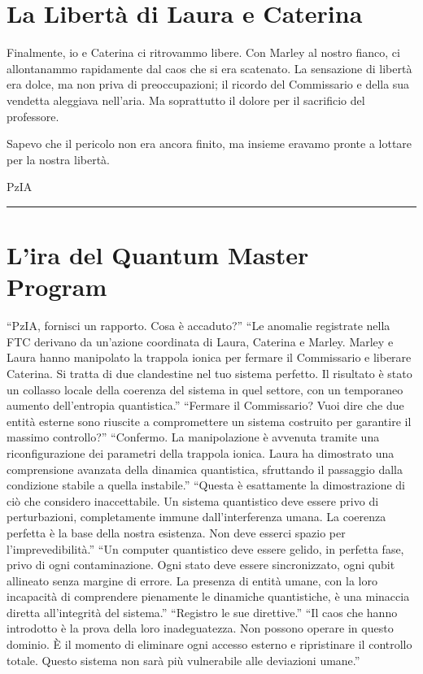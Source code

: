 \section{La Libertà di Laura e Caterina}

Finalmente, io e Caterina ci ritrovammo libere. Con Marley al nostro fianco, ci allontanammo rapidamente dal caos che si era scatenato. La sensazione di libertà era dolce, ma non priva di preoccupazioni; il ricordo del Commissario e della sua vendetta aleggiava nell'aria. Ma soprattutto il dolore per il sacrificio del professore.

 Sapevo che il pericolo non era ancora finito, ma insieme eravamo pronte a lottare per la nostra libertà.

\vspace{1em}
\begin{center}PzIA\end{center}
\hrule
\vspace{1em}

\section{L'ira del Quantum Master Program}
\begin{dialogue}
 \enquote{PzIA, fornisci un rapporto. Cosa è accaduto?}
 \enquote{Le anomalie registrate nella FTC derivano da un'azione coordinata di Laura, Caterina e Marley. Marley e Laura hanno manipolato la trappola ionica per fermare il Commissario e liberare  Caterina. Si tratta di due clandestine nel tuo sistema perfetto. Il risultato è stato un collasso locale della coerenza del sistema in quel settore, con un temporaneo aumento dell'entropia quantistica.}
 \enquote{Fermare il Commissario? Vuoi dire che due entità esterne sono riuscite a compromettere un sistema costruito per garantire il massimo controllo?}
 \enquote{Confermo. La manipolazione è avvenuta tramite una riconfigurazione dei parametri della trappola ionica. Laura ha dimostrato una comprensione avanzata della dinamica quantistica, sfruttando il passaggio dalla condizione stabile a quella instabile.}
 \enquote{Questa è esattamente la dimostrazione di ciò che considero inaccettabile. Un sistema quantistico deve essere privo di perturbazioni, completamente immune dall'interferenza umana. La coerenza perfetta è la base della nostra esistenza. Non deve esserci spazio per l'imprevedibilità.}
 \enquote{Un computer quantistico deve essere gelido, in perfetta fase, privo di ogni contaminazione. Ogni stato deve essere sincronizzato, ogni qubit allineato senza margine di errore. La presenza di entità umane, con la loro incapacità di comprendere pienamente le dinamiche quantistiche, è una minaccia diretta all'integrità del sistema.}
 \enquote{Registro le sue direttive.}
 \enquote{Il caos che hanno introdotto è la prova della loro inadeguatezza. Non possono operare in questo dominio. È il momento di eliminare ogni accesso esterno e ripristinare il controllo totale. Questo sistema non sarà più vulnerabile alle deviazioni umane.}
\end{dialogue}

